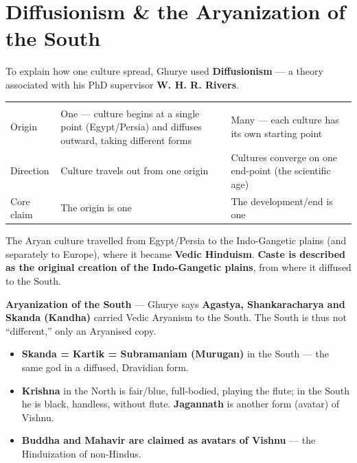 \section{Diffusionism \& the Aryanization of the South}

To explain how one culture spread, Ghurye used \textbf{Diffusionism} --- a theory associated with his PhD supervisor \textbf{W. H. R. Rivers}.

\begin{center}
\begin{tabularx}{\textwidth}{YYY}
 &  &  \\
Origin & One --- culture begins at a single point (Egypt/Persia) and diffuses outward, taking different forms & Many --- each culture has its own starting point \\
Direction & Culture travels out from one origin & Cultures converge on one end-point (the scientific age) \\
Core claim & The origin is one & The development/end is one \\
\end{tabularx}
\end{center}

The Aryan culture travelled from Egypt/Persia to the Indo-Gangetic plains (and separately to Europe), where it became \textbf{Vedic Hinduism}. \textbf{Caste is described as the original creation of the Indo-Gangetic plains}, from where it diffused to the South.

\begin{KeyConcept}
\textbf{Aryanization of the South} --- Ghurye says \textbf{Agastya, Shankaracharya and Skanda (Kandha)} carried Vedic Aryanism to the South. The South is thus not ``different,'' only an Aryanised copy.
\end{KeyConcept}

\begin{itemize}
\item \textbf{Skanda = Kartik = Subramaniam (Murugan)} in the South --- the same god in a diffused, Dravidian form.
\item \textbf{Krishna} in the North is fair/blue, full-bodied, playing the flute; in the South he is black, handless, without flute. \textbf{Jagannath} is another form (avatar) of Vishnu.
\item \textbf{Buddha and Mahavir are claimed as avatars of Vishnu} --- the Hinduization of non-Hindus.
\end{itemize}

